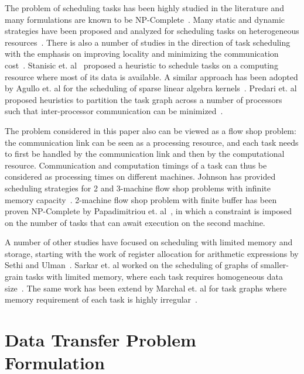 \documentclass[sigconf]{acmart}
\begin{document}
	
	The problem of scheduling tasks has been highly studied in the literature and many formulations are known to be NP-Complete~\cite{GareyJohnson}. Many static and dynamic strategies have been proposed and analyzed for scheduling tasks on heterogeneous resources~\cite{heft-Topcuoglu,hipc16multiresource,ipdps16starpu}. There is also a number of studies in the direction of task scheduling with the emphasis on improving locality and minimizing the communication cost~\cite{starpu,heft-Topcuoglu}. Stanisic et. al~\cite{luka-dmdar} proposed a heuristic to schedule tasks on a computing resource where most of its data is available. A similar approach has been adopted by Agullo et. al for the scheduling of sparse linear algebra kernels~\cite{agullo_fmm}. Predari et. al proposed heuristics to partition the task graph across a number of processors such that inter-processor communication can be minimized~\cite{predari:tel-01518956}.
	
	The problem considered in this paper also can be viewed as a flow shop problem: the communication link can be seen as a processing resource, and each task needs to first be handled by the communication link and then by the computational resource. Communication and computation timings of a task can thus be considered as processing times on different machines. Johnson has provided scheduling strategies for 2 and 3-machine flow shop problems with infinite memory capacity~\cite{johnson}. 2-machine flow shop problem with finite buffer has been proven NP-Complete by Papadimitriou et. al~\cite{Papadimitriou:1980:FSL:322203.322213}, in which a constraint is imposed on the number of tasks that can await execution on the second machine.
	
	A number of other studies have focused on scheduling with limited memory and storage, starting with the work of register allocation for arithmetic expressions by Sethi and Ulman~\cite{Sethi:1970:GOC:321607.321620}. Sarkar et. al worked on the scheduling of graphs of smaller-grain tasks with limited memory, where each task requires homogeneous data size~\cite{vsarkar-pact}. The same work has been extend by Marchal et. al for task graphs where memory requirement of each task is highly irregular~\cite{loris-ipdps18}.
	
	
	
	\section{Data Transfer Problem Formulation}
	\label{sec:theoreticalProof}
	
\end{document}
